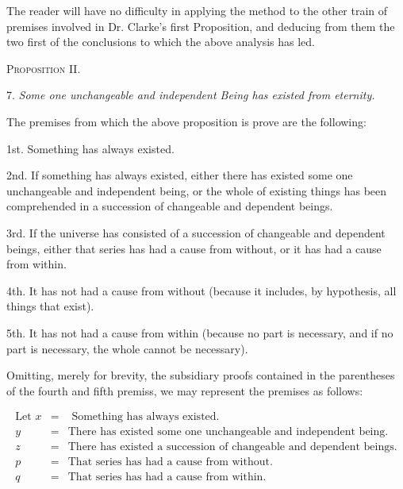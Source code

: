 \documentclass[oneside]{book}
\begin{document}
The reader will have no difficulty in applying the method
to the other train of premises involved in Dr. Clarke's first
Proposition, and deducing from them the two first of the conclusions
to which the above analysis has led.

\begin{center}
\textsc{Proposition II}.
\end{center}

7. \textit{Some one unchangeable and independent Being has existed
from eternity.}

The premises from which the above proposition is prove
are the following:

1st. Something has always existed.

2nd. If something has always existed, either there has existed
some one unchangeable and independent being, or the whole of
existing things has been comprehended in a succession of
changeable and dependent beings.

3rd. If the universe has consisted of a succession of
changeable and dependent beings, either that series has had a cause from
without, or it has had a cause from within.

4th. It has not had a cause from without (because it includes,
by hypothesis, all things that exist).

5th. It has not had a cause from within (because no part is
necessary, and if no part is necessary, the whole cannot be necessary).

Omitting, merely for brevity, the subsidiary proofs contained
in the parentheses of the fourth and fifth premiss, we may represent
the premises as follows:

\begin{eqnarray*}
\textrm{Let } x &=& \textrm{ Something has always existed.} \\
y &=& \textrm{There has existed some one unchangeable and independent being.} \\
z &=& \textrm{There has existed a succession of changeable and
dependent beings.} \\
p &=& \textrm{That series has had a cause from without.} \\
q &=& \textrm{That series has had a cause from within.}
\end{eqnarray*}
\end{document}
